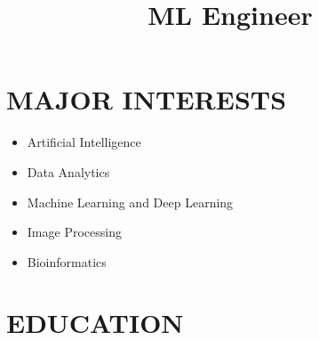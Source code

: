 \documentclass[11pt,a4paper,sans]{moderncv} %
\title{ML Engineer}
\begin{document}

%





%

\makecvtitle %


\section{MAJOR INTERESTS}
\begin{itemize}
    \item Artificial Intelligence
    \item Data Analytics
    \item Machine Learning and Deep Learning
    \item Image Processing
    \item Bioinformatics

\end{itemize} 


\section{EDUCATION}
\end{document}
